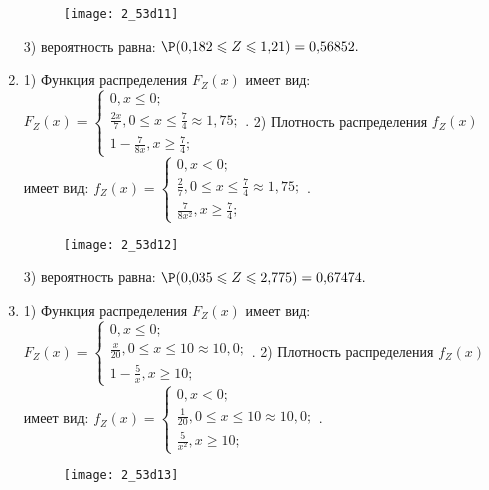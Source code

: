 \documentclass[a4paper,12pt]{article}
\begin{document}
\begin{enumerate}
\begin{figure}[H]
    \texttt{[image: 2\_53d11]}
\end{figure}


3) вероятность равна:
$
\P(0,\!182\leqslant Z\leqslant 1,\!21)=
0,\!56852.
$



\item


1) Функция распределения $F_Z(x)$ имеет вид:
$
F_Z(x)=\left\{
\begin{array}{l}
0, x\leqslant 0;\\
\frac{2 x}{7}, 0\leqslant x\leqslant \frac{7}{4}\approx 1,\!75;\\
1 - \frac{7}{8 x}, x\geqslant\frac{7}{4};
\end{array}.
\right.
$
2) Плотность распределения $f_Z(x)$ имеет вид:
$
f_Z(x)=\left\{
\begin{array}{l}
0, x<0;\\
\frac{2}{7}, 0\leqslant x\leqslant \frac{7}{4}\approx 1,\!75;\\
\frac{7}{8 x^{2}}, x\geqslant\frac{7}{4};
\end{array}.
\right.
$


\begin{figure}[H]
    \texttt{[image: 2\_53d12]}
\end{figure}


3) вероятность равна:
$
\P(0,\!035\leqslant Z\leqslant 2,\!775)=
0,\!67474.
$



\item


1) Функция распределения $F_Z(x)$ имеет вид:
$
F_Z(x)=\left\{
\begin{array}{l}
0, x\leqslant 0;\\
\frac{x}{20}, 0\leqslant x\leqslant 10\approx 10,\!0;\\
1 - \frac{5}{x}, x\geqslant10;
\end{array}.
\right.
$
2) Плотность распределения $f_Z(x)$ имеет вид:
$
f_Z(x)=\left\{
\begin{array}{l}
0, x<0;\\
\frac{1}{20}, 0\leqslant x\leqslant 10\approx 10,\!0;\\
\frac{5}{x^{2}}, x\geqslant10;
\end{array}.
\right.
$


\begin{figure}[H]
    \texttt{[image: 2\_53d13]}
\end{figure}



\end{enumerate}
\end{document}
